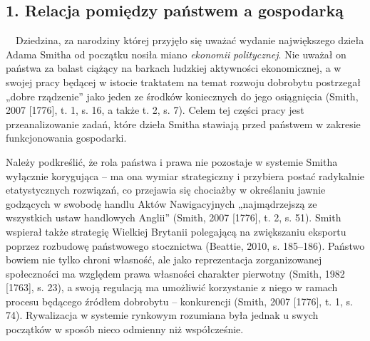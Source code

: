 \documentclass[a4paper]{article}
\begin{document}
\subsection[1. Relacja pomiędzy państwem a gospodarką]{1. Relacja pomiędzy państwem a gospodarką}
\ \ Dziedzina, za narodziny której przyjęło się uważać wydanie największego dzieła Adama Smitha od początku nosiła miano
\textit{ekonomii} \textit{politycznej}. Nie uważał on państwa za balast ciążący na barkach ludzkiej aktywności
ekonomicznej, a w swojej pracy będącej w istocie traktatem na temat rozwoju dobrobytu postrzegał „dobre rządzenie” jako
jeden ze środków koniecznych do jego osiągnięcia \label{ref:RNDnQbUYFullV}(Smith, 2007 [1776], t. 1, s. 16, a także t.
2, s. 7). Celem tej części pracy jest przeanalizowanie zadań, które dzieła Smitha stawiają przed państwem w zakresie
funkcjonowania gospodarki.

 Należy podkreślić, że rola państwa i prawa nie pozostaje w systemie Smitha wyłącznie korygująca – ma ona wymiar
strategiczny i przybiera postać radykalnie etatystycznych rozwiązań, co przejawia się chociażby w określaniu jawnie
godzących w swobodę handlu Aktów Nawigacyjnych „najmądrzejszą ze wszystkich ustaw handlowych Anglii”
\label{ref:RNDSfqMVn36ju}(Smith, 2007 [1776], t. 2, s. 51). Smith wspierał także strategię Wielkiej Brytanii polegającą
na zwiększaniu eksportu poprzez rozbudowę państwowego stocznictwa \label{ref:RNDNSdWnZqXWk}(Beattie, 2010, s. 185–186).
Państwo bowiem nie tylko chroni własność, ale jako reprezentacja zorganizowanej społeczności ma względem prawa
własności charakter pierwotny \label{ref:RNDRS9jKbzBoD}(Smith, 1982 [1763], s. 23), a swoją regulacją ma umożliwić
korzystanie z niego w ramach procesu będącego źródłem dobrobytu – konkurencji \label{ref:RND8sqtcJZ1ob}(Smith, 2007
[1776], t. 1, s. 74). Rywalizacja w systemie rynkowym rozumiana była jednak u swych początków w sposób nieco odmienny
niż współcześnie.
\end{document}
